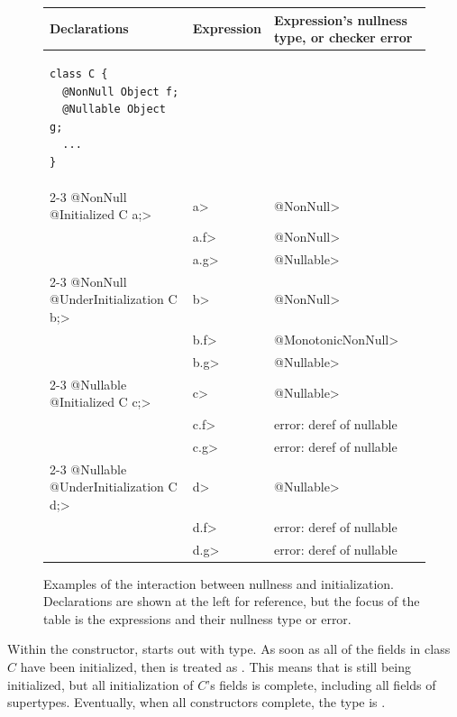 \begin{figure}
\begin{tabular}{l|l|l}
Declarations & Expression & Expression's nullness type, or checker error \\ \hline
\begin{minipage}{1.5in}
\begin{Verbatim}
class C {
  @NonNull Object f;
  @Nullable Object g;
  ...
}
\end{Verbatim}
\end{minipage} & & \\ \cline{2-3}
\<@NonNull @Initialized C a;>
& \<a> & \<@NonNull> \\
& \<a.f> & \<@NonNull> \\
& \<a.g> & \<@Nullable> \\ \cline{2-3}
\<@NonNull @UnderInitialization C b;>
& \<b> & \<@NonNull> \\
& \<b.f> & \<@MonotonicNonNull> \\
& \<b.g> & \<@Nullable> \\ \cline{2-3}
\<@Nullable @Initialized C c;>
& \<c> & \<@Nullable> \\
& \<c.f> & error: deref of nullable \\
& \<c.g> & error: deref of nullable \\ \cline{2-3}
\<@Nullable @UnderInitialization C d;>
& \<d> & \<@Nullable> \\
& \<d.f> & error: deref of nullable \\
& \<d.g> & error: deref of nullable \\
\end{tabular}
\caption{Examples of the interaction between nullness and initialization.
  Declarations are shown at the left for reference, but the focus of the
  table is the expressions and their nullness type or error.}
\label{fig-initialization-examples}
\end{figure}




Within the constructor,
 starts out with  type.
As soon as all of the  fields
in class $C$ have been initialized, then  is treated as
.
This means that  is still being initialized, but all
initialization of $C$'s fields is complete, including all fields of supertypes.
Eventually, when all constructors complete, the type is
.

